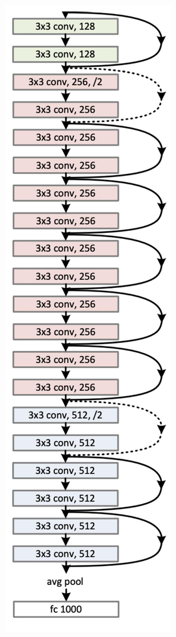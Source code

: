 \documentclass[10pt]{article}
\begin{document}
\begin{center}
\includegraphics[max width=\textwidth]{2024_01_08_959e2db67a31f073f6d2g-21}
\end{center}
\end{document}
